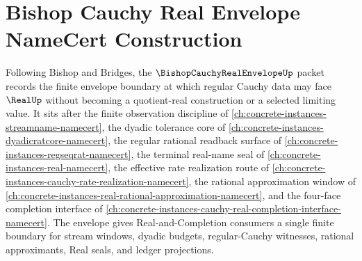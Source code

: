 \chapter{Bishop Cauchy Real Envelope NameCert Construction}
\label{ch:concrete-instances-bishop-cauchy-real-envelope-namecert}

Following Bishop and Bridges, the $\BishopCauchyRealEnvelopeUp$ packet records the finite envelope boundary at which regular Cauchy data may face $\RealUp$ without becoming a quotient-real construction or a selected limiting value. It sits after the finite observation discipline of \autoref{ch:concrete-instances-streamname-namecert}, the dyadic tolerance core of \autoref{ch:concrete-instances-dyadicratcore-namecert}, the regular rational readback surface of \autoref{ch:concrete-instances-regseqrat-namecert}, the terminal real-name seal of \autoref{ch:concrete-instances-real-namecert}, the effective rate realization route of \autoref{ch:concrete-instances-cauchy-rate-realization-namecert}, the rational approximation window of \autoref{ch:concrete-instances-real-rational-approximation-namecert}, and the four-face completion interface of \autoref{ch:concrete-instances-cauchy-real-completion-interface-namecert}. The envelope gives Real-and-Completion consumers a single finite boundary for stream windows, dyadic budgets, regular-Cauchy witnesses, rational approximants, Real seals, and ledger projections.

